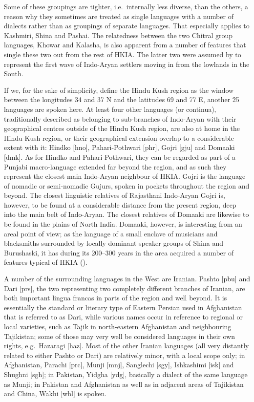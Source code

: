 \documentclass[output=collectionpaper]{langsci/langscibook}
\begin{document}
Some of these groupings are tighter, i.e.\ internally less diverse, than the others, a reason why they sometimes are treated as single languages with a number of dialects rather than as groupings of separate languages. That especially applies to Kashmiri, Shina and Pashai. The relatedness between the two Chitral group languages, Khowar and Kalasha, is also apparent from a number of features that single these two out from the rest of HKIA. The latter two were assumed by \citet[51]{Morgenstierne1932} to represent the first wave of Indo-Aryan settlers moving in from the lowlands in the South.

If we, for the sake of simplicity, define the Hindu Kush region as the window between the longitudes 34 and 37 N and the latitudes 69 and 77 E, another 25 languages are spoken here. At least four other languages (or continua), traditionally described as belonging to sub-branches of Indo-Aryan with their geographical centres outside of the Hindu Kush region, are also at home in the Hindu Kush region, or their geographical extension overlap to a considerable extent with it: Hindko [hno], Pahari-Pothwari [phr], Gojri [gju] and Domaaki [dmk]. As for Hindko and Pahari-Pothwari, they can be regarded as part of a Punjabi macro-language extended far beyond the region, and as such they represent the closest main Indo-Aryan neighbour of HKIA. Gojri is the language of nomadic or semi-nomadic Gujurs, spoken in pockets throughout the region and beyond. The closest linguistic relatives of Rajasthani Indo-Aryan Gojri is, however, to be found at a considerable distance from the present region, deep into the main belt of Indo-Aryan. The closest relatives of Domaaki are likewise to be found in the plains of North India. Domaaki, however, is interesting from an areal point of view; as the language of a small enclave of  musicians and blacksmiths surrounded by locally dominant speaker groups of Shina and Burushaski, it has during its 200--300 years in the area acquired a number of features typical of HKIA (\citealt[165--166]{Weinreich2011}).

A number of the surrounding languages in the West are Iranian. Pashto [pbu] and Dari [prs], the two representing two completely different branches of Iranian, are both important lingua francas in parts of the region and well beyond. It is essentially the standard or literary type of Eastern Persian used in Afghanistan that is referred to as Dari, while various names occur in reference to regional or local varieties, such as Tajik in north-eastern Afghanistan and neighbouring Tajikistan; some of those may very well be considered languages in their own rights, e.g.\ Hazaragi [haz]. Most of the other Iranian languages (all very distantly related to either Pashto or Dari) are relatively minor, with a local scope only; in Afghanistan, Parachi [prc], Munji [mnj], Sanglechi [sgy], Ishkashimi [isk] and Shughni [sgh]; in Pakistan, Yidgha [ydg], basically a dialect of the same language as Munji; in Pakistan and Afghanistan as well as in adjacent areas of Tajikistan and China, Wakhi [wbl] is spoken.
\end{document}
